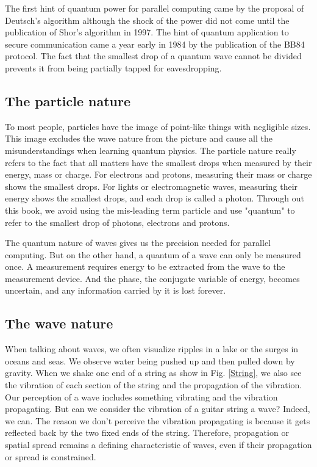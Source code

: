 \documentclass{book}
\begin{document}
The first hint of quantum power for parallel computing came by the proposal of Deutsch's algorithm\cite{1985Deutsch} although the shock of the power did not come until the publication of Shor's algorithm in 1997. The hint of quantum application to secure communication came a year early in 1984 by the publication of the BB84 protocol\cite{BB84}. The fact that the smallest drop of a quantum wave cannot be divided prevents it from being partially tapped for eavesdropping.

\subsection{The particle nature}
To most people, particles have the image of point-like things with negligible sizes. This image excludes the wave nature from the picture and cause all the misunderstandings when learning quantum physics. The particle nature really refers to the fact that all matters have the smallest drops when measured by their energy, mass or charge. For electrons and protons, measuring their mass or charge shows the smallest drops. For lights or electromagnetic waves, measuring their energy shows the smallest drops, and each drop is called a photon. Through out this book, we avoid using the mis-leading term particle and use "quantum" to refer to the smallest drop of photons, electrons and protons.

The quantum nature of waves gives us the precision needed for parallel computing. But on the other hand, a quantum of a wave can only be measured once. A measurement requires energy to be extracted from the wave to the measurement device. And the phase, the conjugate variable of energy, becomes uncertain, and any information carried by it is lost forever.

\subsection{The wave nature}
When talking about waves, we often visualize ripples in a lake or the surges in oceans and seas. We observe water being pushed up and then pulled down by gravity. When we shake one end of a string as show in Fig. \ref{String}, we also see the vibration of each section of the string and the propagation of the vibration. Our perception of a wave includes something vibrating and the vibration propagating. But can we consider the vibration of a guitar string a wave? Indeed, we can. The reason we don't perceive the vibration propagating is because it gets reflected back by the two fixed ends of the string. Therefore, propagation or spatial spread remains a defining characteristic of waves, even if their propagation or spread is constrained.
\end{document}
